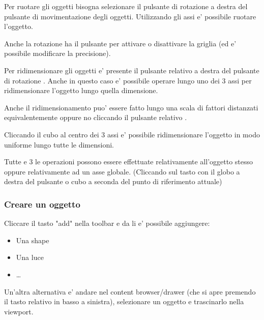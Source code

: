                 Per ruotare gli oggetti bisogna selezionare il pulsante di rotazione \UEMovementEditingIcon a destra del pulsante di movimentazione degli oggetti. Utilizzando gli assi e' possibile ruotare l'oggetto.

                \begin{notebox}
                    Anche la rotazione ha il pulsante per attivare o disattivare la griglia \UERotationSnappingIcon (ed e' possibile modificare la precisione).
                \end{notebox}

                Per ridimensionare gli oggetti e' presente il pulsante relativo a destra del pulsante di rotazione \UEMovementEditingIcon. Anche in questo caso e' possibile operare lungo uno dei 3 assi per ridimensionare l'oggetto lungo quella dimensione.

                \begin{notebox}
                    Anche il ridimensionamento puo' essere fatto lungo una scala di fattori distanzati equivalentemente oppure no cliccando il pulsante relativo \UEScaleSnappingIcon.
                \end{notebox}

                Cliccando il cubo al centro dei 3 assi e' possibile ridimensionare l'oggetto in modo uniforme lungo tutte le dimensioni.

                Tutte e 3 le operazioni possono essere effettuate relativamente all'oggetto stesso oppure relativamente ad un asse globale.
                (Cliccando sul tasto con il globo \UEGlobalIcon a destra del pulsante \UEMovementEditingIcon o cubo a seconda del punto di riferimento attuale)

            \subsubsection{Creare un oggetto}
                Cliccare il tasto "add" \UEQuickAddIcon nella toolbar e da li e' possibile aggiungere:
                \begin{itemize}
                    \item Una shape
                    \item Una luce
                    \item \dots
                \end{itemize}

                Un'altra alternativa e' andare nel content browser/drawer (che si apre premendo il tasto relativo \UEContentBrowserIcon in basso a sinistra), selezionare un oggetto e trascinarlo nella viewport.

